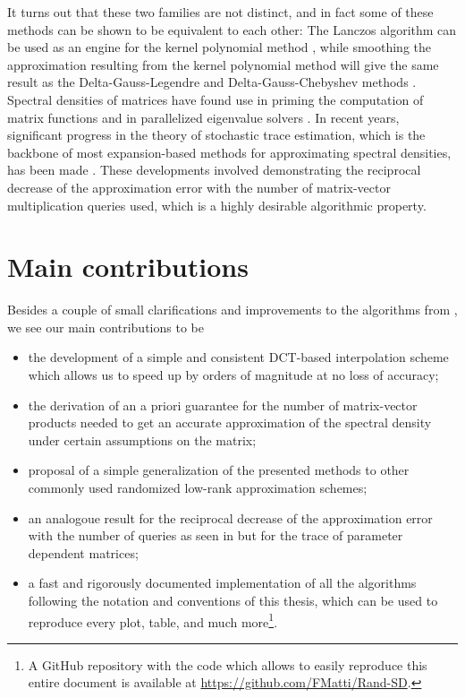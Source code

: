 It turns out that these two families are not distinct, and in fact some of these
methods can be shown to be equivalent to each other: The Lanczos algorithm
can be used as an engine for the kernel polynomial method \cite{chen2023kpm},
while smoothing the approximation resulting from the kernel polynomial method 
will give the same result as the Delta-Gauss-Legendre and Delta-Gauss-Chebyshev
methods \cite{lin2016review}.\\ 

Spectral densities of matrices have found use in priming the computation of matrix
functions \cite{fan2020spectrum} and in parallelized eigenvalue solvers
\cite{polizzi2009density, li2019slicing}. In recent years, significant progress
in the theory of stochastic trace estimation, which is the backbone of most
expansion-based methods for approximating spectral densities, has been made \cite{meyer2021hutch, persson2022hutch}.
These developments involved demonstrating the reciprocal decrease
of the approximation error with the number of matrix-vector multiplication
queries used, which is a highly desirable algorithmic property.


\section{Main contributions}
\label{sec:1-introduction-contributions}

Besides a couple of small clarifications and improvements to the algorithms 
from \cite{lin2017randomized}, we see our main contributions to be

\begin{itemize}
    \item the development of a simple and consistent \gls{DCT}-based interpolation
          scheme which allows us to speed up \cite[algorithm~5]{lin2017randomized}
          by orders of magnitude at no loss of accuracy;
    \item the derivation of an a priori guarantee for the number of matrix-vector
          products needed to get an accurate approximation of the spectral
          density under certain assumptions on the matrix;
    \item proposal of a simple generalization of the presented methods to other
          commonly used randomized low-rank approximation schemes;
    \item an analogoue result for the reciprocal decrease of the approximation
          error with the number of queries as seen in \cite[theorem~1]{meyer2021hutch}
          but for the trace of parameter dependent matrices;
    \item a fast and rigorously documented implementation of all the algorithms
          following the notation and conventions of this thesis, which can be used to
          reproduce every plot, table, and much more\footnote{A GitHub repository
          with the code which allows to easily reproduce this entire document
          is available at \url{https://github.com/FMatti/Rand-SD}.}.
\end{itemize}

